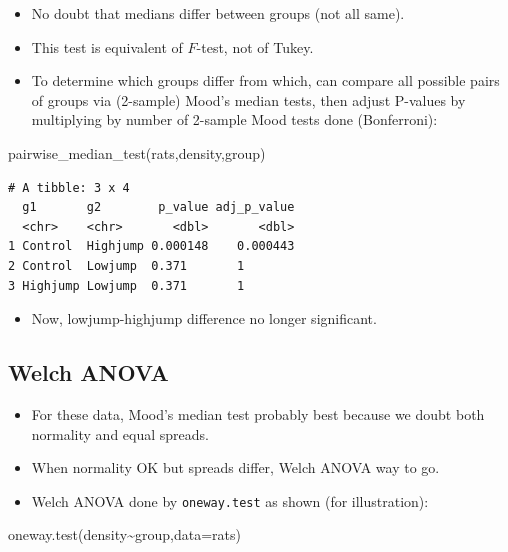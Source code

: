 \documentclass[
  letterpaper,
  DIV=11,
  numbers=noendperiod]{scrartcl}
\newenvironment{Shaded}{\begin{snugshade}}{\end{snugshade}}
\newcommand{\AttributeTok}[1]{\textcolor[rgb]{0.40,0.45,0.13}{#1}}
\newcommand{\FunctionTok}[1]{\textcolor[rgb]{0.28,0.35,0.67}{#1}}
\newcommand{\NormalTok}[1]{\textcolor[rgb]{0.00,0.23,0.31}{#1}}
\newcommand{\SpecialCharTok}[1]{\textcolor[rgb]{0.37,0.37,0.37}{#1}}
\providecommand{\tightlist}{%
  \setlength{\itemsep}{0pt}\setlength{\parskip}{0pt}}\usepackage{longtable,booktabs,array}
\begin{document}
\begin{itemize}
\tightlist
\item
  No doubt that medians differ between groups (not all same).
\item
  This test is equivalent of \(F\)-test, not of Tukey.
\item
  To determine which groups differ from which, can compare all possible
  pairs of groups via (2-sample) Mood's median tests, then adjust
  P-values by multiplying by number of 2-sample Mood tests done
  (Bonferroni):
\end{itemize}

\begin{Shaded}
\begin{Highlighting}[]
\FunctionTok{pairwise\_median\_test}\NormalTok{(rats,density,group)}
\end{Highlighting}
\end{Shaded}

\begin{verbatim}
# A tibble: 3 x 4
  g1       g2        p_value adj_p_value
  <chr>    <chr>       <dbl>       <dbl>
1 Control  Highjump 0.000148    0.000443
2 Control  Lowjump  0.371       1       
3 Highjump Lowjump  0.371       1       
\end{verbatim}

\begin{itemize}
\tightlist
\item
  Now, lowjump-highjump difference no longer significant.
\end{itemize}

\hypertarget{welch-anova}{%
\subsection{Welch ANOVA}\label{welch-anova}}

\begin{itemize}
\tightlist
\item
  For these data, Mood's median test probably best because we doubt both
  normality and equal spreads.
\item
  When normality OK but spreads differ, Welch ANOVA way to go.
\item
  Welch ANOVA done by \texttt{oneway.test} as shown (for illustration):
\end{itemize}

\begin{Shaded}
\begin{Highlighting}[]
\FunctionTok{oneway.test}\NormalTok{(density}\SpecialCharTok{\textasciitilde{}}\NormalTok{group,}\AttributeTok{data=}\NormalTok{rats)}
\end{Highlighting}
\end{Shaded}
\end{document}
